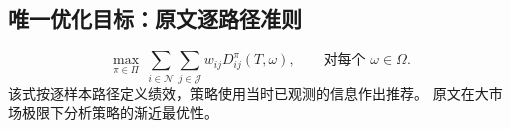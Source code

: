\documentclass[UTF8,11pt]{ctexart}
\begin{document}
\subsection*{唯一优化目标：原文逐路径准则}
\[
 \max_{\pi\in\Pi}\ \sum_{i\in\mathcal N}\sum_{j\in\mathcal J}w_{ij}D_{ij}^\pi(T,\omega),\qquad\text{对每个 }\omega\in\Omega.\tag{6}
\]
该式按逐样本路径定义绩效，策略使用当时已观测的信息作出推荐。
原文在大市场极限下分析策略的渐近最优性。
\end{document}
